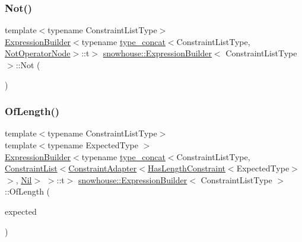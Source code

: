 \mbox{\label{structsnowhouse_1_1ExpressionBuilder_ab73bbbbbe02a9ddbb28e2790a636bc0e}} 
\subsubsection{\texorpdfstring{Not()}{Not()}}
{\footnotesize\ttfamily template$<$typename Constraint\+List\+Type$>$ \\
\mbox{\hyperlink{structsnowhouse_1_1ExpressionBuilder}{Expression\+Builder}}$<$typename \mbox{\hyperlink{structsnowhouse_1_1type__concat}{type\+\_\+concat}}$<$Constraint\+List\+Type, \mbox{\hyperlink{structsnowhouse_1_1ExpressionBuilder_a5de76f3efcd7456a66de89edc66b21a4}{Not\+Operator\+Node}}$>$\+::t$>$ \mbox{\hyperlink{structsnowhouse_1_1ExpressionBuilder}{snowhouse\+::\+Expression\+Builder}}$<$ Constraint\+List\+Type $>$\+::Not (\begin{DoxyParamCaption}{ }\end{DoxyParamCaption})\hspace{0.3cm}{\ttfamily [inline]}}

\mbox{\label{structsnowhouse_1_1ExpressionBuilder_a21d8f0155d2c27b9fb6b6d2f67c7fb69}} 
\subsubsection{\texorpdfstring{OfLength()}{OfLength()}}
{\footnotesize\ttfamily template$<$typename Constraint\+List\+Type$>$ \\
template$<$typename Expected\+Type $>$ \\
\mbox{\hyperlink{structsnowhouse_1_1ExpressionBuilder}{Expression\+Builder}}$<$typename \mbox{\hyperlink{structsnowhouse_1_1type__concat}{type\+\_\+concat}}$<$Constraint\+List\+Type, \mbox{\hyperlink{structsnowhouse_1_1ConstraintList}{Constraint\+List}}$<$\mbox{\hyperlink{structsnowhouse_1_1ConstraintAdapter}{Constraint\+Adapter}}$<$\mbox{\hyperlink{structsnowhouse_1_1HasLengthConstraint}{Has\+Length\+Constraint}}$<$Expected\+Type$>$ $>$, \mbox{\hyperlink{structsnowhouse_1_1Nil}{Nil}}$>$ $>$\+::t$>$ \mbox{\hyperlink{structsnowhouse_1_1ExpressionBuilder}{snowhouse\+::\+Expression\+Builder}}$<$ Constraint\+List\+Type $>$\+::Of\+Length (\begin{DoxyParamCaption}\item[{const Expected\+Type \&}]{expected }\end{DoxyParamCaption})\hspace{0.3cm}{\ttfamily [inline]}}

